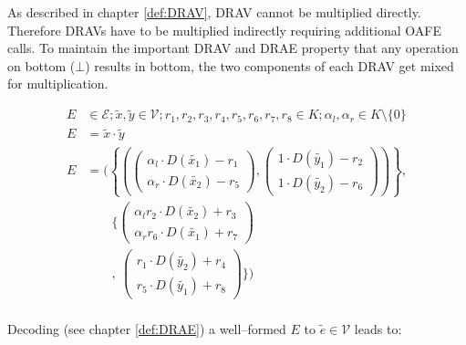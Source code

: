 
As described in chapter \ref{def:DRAV}, DRAV cannot be multiplied directly.
Therefore DRAVs have to be multiplied indirectly requiring additional OAFE
calls. To maintain the important DRAV and DRAE property that any operation on
bottom ($\bot$) results in bottom, the two components of each DRAV get mixed for
multiplication.




\begin{align*}
  E & \in \mathcal{E}; \widetilde{x}, \widetilde{y} \in \mathcal{V};
  r_1, r_2, r_3, r_4, r_5, r_6, r_7, r_8 \in K;
  \alpha_l, \alpha_r \in K \setminus \{0\} \\
  E & = \widetilde{x} \cdot \widetilde{y} \\
  E & = \Bigg(\left\{\left(
            \begin{pmatrix}
              \alpha_l \cdot D(\widetilde{x_1}) - r_1 \\
              \alpha_r \cdot D(\widetilde{x_2}) - r_5
            \end{pmatrix},
            \begin{pmatrix}
              1        \cdot D(\widetilde{y_1}) - r_2 \\
              1        \cdot D(\widetilde{y_2}) - r_6
            \end{pmatrix}
        \right)\right\}, \\
    &   \qquad\bigg\{
        \begin{pmatrix}
            \alpha_lr_2 \cdot D(\widetilde{x_2}) + r_3 \\
            \alpha_rr_6 \cdot D(\widetilde{x_1}) + r_7
          \end{pmatrix} \\
    &  \qquad,
        \ \begin{pmatrix}
            r_1        \cdot D(\widetilde{y_2}) + r_4 \\
            r_5        \cdot D(\widetilde{y_1}) + r_8
          \end{pmatrix}
        \bigg\}\Bigg) \\
\end{align*}

Decoding (see chapter \ref{def:DRAE}) a well--formed $E$ to
$\widetilde{e} \in \mathcal{V}$ leads to:

